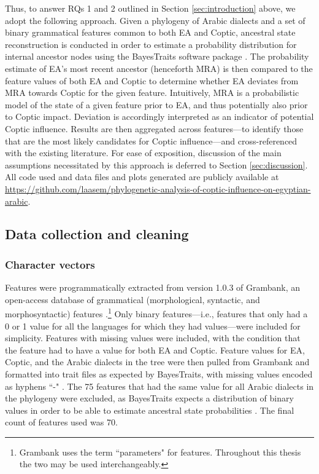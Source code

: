 \documentclass[12pt,a4paper]{article}
\begin{document}
Thus, to answer RQs 1 and 2 outlined in Section \ref{sec:introduction} above, we adopt the following approach. Given a phylogeny of Arabic dialects and a set of binary grammatical features common to both EA and Coptic, ancestral state reconstruction is conducted in order to estimate a probability distribution for internal ancestor nodes using the BayesTraits software package \parencite{pagel_bayesian_2004, luo_ancestral_2022}. The probability estimate of EA's most recent ancestor (henceforth MRA) is then compared to the feature values of both EA and Coptic to determine whether EA deviates from MRA towards Coptic for the given feature. Intuitively, MRA is a probabilistic model of the state of a given feature prior to EA, and thus potentially also prior to Coptic impact. Deviation is accordingly interpreted as an indicator of potential Coptic influence. Results are then aggregated across features---to identify those that are the most likely candidates for Coptic influence---and cross-referenced with the existing literature. For ease of exposition, discussion of the main assumptions necessitated by this approach is deferred to Section \ref{sec:discussion}. All code used and data files and plots generated are publicly available at \url{https://github.com/laasem/phylogenetic-analysis-of-coptic-influence-on-egyptian-arabic}.

\subsection{Data collection and cleaning}

\subsubsection{Character vectors}

Features were programmatically extracted from version 1.0.3 of Grambank, an open-access database of grammatical (morphological, syntactic, and morphosyntactic) features \parencite{skirgard_grambank_2023}.\footnote{Grambank uses the term ``parameters" for features. Throughout this thesis the two may be used interchangeably.} Only binary features---i.e., features that only had a 0 or 1 value for all the languages for which they had values---were included for simplicity. Features with missing values were included, with the condition that the feature had to have a value for both EA and Coptic. Feature values for EA, Coptic, and the Arabic dialects in the tree were then pulled from Grambank and formatted into trait files as expected by BayesTraits, with missing values encoded as hyphens ``-" \parencite{pagel_bayesian_2004, luo_ancestral_2022}. The 75 features that had the same value for all Arabic dialects in the phylogeny were excluded, as BayesTraits expects a distribution of binary values in order to be able to estimate ancestral state probabilities \parencite{pagel_bayesian_2004, luo_ancestral_2022}. The final count of features used was 70.
\end{document}
